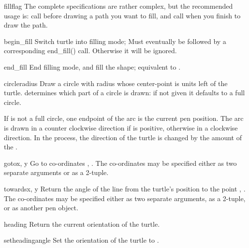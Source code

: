 \begin{funcdesc}{fill}{flag}
The complete specifications are rather complex, but the recommended 
usage is: call  before drawing a path you want to fill,
and call  when you finish to draw the path.
\end{funcdesc}

\begin{funcdesc}{begin\_fill}{}
Switch turtle into filling mode; 
Must eventually be followed by a corresponding end_fill() call.
Otherwise it will be ignored.
\end{funcdesc}

\begin{funcdesc}{end\_fill}{}
End filling mode, and fill the shape; equivalent to .
\end{funcdesc}

\begin{funcdesc}{circle}{radius}
Draw a circle with radius  whose center-point is
 units left of the turtle.
 determines which part of a circle is drawn: if
not given it defaults to a full circle.

If  is not a full circle, one endpoint of the arc is the
current pen position. The arc is drawn in a counter clockwise
direction if  is positive, otherwise in a clockwise
direction.  In the process, the direction of the turtle is changed
by the amount of the .
\end{funcdesc}

\begin{funcdesc}{goto}{x, y}
Go to co-ordinates , .  The co-ordinates may be
specified either as two separate arguments or as a 2-tuple.
\end{funcdesc}

\begin{funcdesc}{towards}{x, y}
Return the angle of the line from the turtle's position
to the point , . The co-ordinates may be
specified either as two separate arguments, as a 2-tuple,
or as another pen object.
\end{funcdesc}

\begin{funcdesc}{heading}{}
Return the current orientation of the turtle.
\end{funcdesc}

\begin{funcdesc}{setheading}{angle}
Set the orientation of the turtle to .
\end{funcdesc}

